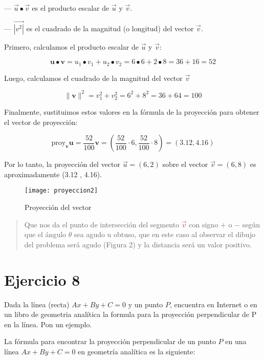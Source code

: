 \documentclass{article}
\begin{document}
    --- $\vec{u} \bullet \vec{v}$ es el producto escalar de $\vec{u}$ y $\vec{v}$.

    --- $\vec{|v^2|}$ es el cuadrado de la magnitud (o longitud) 
   del vector $\vec{v}$.
   
   Primero, calculamos el producto escalar de $\vec{u}$ y $\vec{v}$:
   
   $$\mathbf{u} \bullet \mathbf{v} = u_1 \bullet v_1 + u_2 \bullet v_2 = 6 \bullet 6 + 2 \bullet 8 = 36 + 16 = 52$$
   
   Luego, calculamos el cuadrado de la magnitud del vector $\vec{v}$
   
   $$\|\mathbf{v}\|^2 = v_1^2 + v_2^2 = 6^2 + 8^2 = 36 + 64 = 100$$
   
   Finalmente, sustituimos estos valores en la fórmula de la proyección para obtener el vector de proyección:
   
   $$\text{proy}_{\mathbf{v}} \mathbf{u} = 
   \frac{52}{100} \mathbf{v} = \left(\frac{52}{100} \cdot 6, \frac{52}{100} \cdot 8\right) = (3.12, 4.16)$$
   
   Por lo tanto, la proyección del vector $\vec{u} = (6,2)$ sobre el
    vector $\vec{v}= (6,8)$ es aproximadamente (3.12 , 4.16).
     \begin{figure*}[h]
      \centering
      \texttt{[image: proyeccion2]}
      \caption{Proyección del vector}
      \label{fig:ejercicio6_2}
     \end{figure*}
      \begin{quote}
         Que nos da el punto de intersección del segmento \textcolor{red}{$\vec{v}$} con signo \emph{$+$}
         o \emph{$-$} según que el ángulo $\theta$ sea agudo u obtuso, que en este caso 
         al observar el dibujo del problema será agudo (Figura 2) y la distancia será un valor positivo.
      \end{quote}
    



 \section*{Ejercicio 8}
 Dada la línea (recta) $Ax + By + C = 0$ y un punto $P$,
  encuentra en Internet o en un libro de geometria analítica
   la formula para la proyección perpendicular de P en la línea. 
   Pon un ejemplo.

   \noindent La fórmula para encontrar la proyección perpendicular de un punto $ P $ 
   en una línea $ Ax + By + C = 0 $ en geometría analítica es la siguiente:
\end{document}
